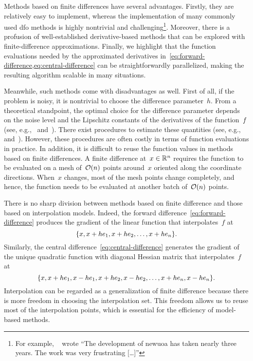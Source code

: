 Methods based on finite differences have several advantages.
Firstly, they are relatively easy to implement, whereas the implementation of many commonly used \gls{dfo} methods is highly nontrivial and challenging\footnote{For example, \citeauthor{Powell_2006}~\cite{Powell_2006} wrote \enquote{The development of \gls{newuoa} has taken nearly three years. The work was very frustrating [\dots]}}.
Moreover, there is a profusion of well-established derivative-based methods that can be explored with finite-difference approximations.
Finally, we highlight that the function evaluations needed by the approximated derivatives in~\cref{eq:forward-difference,eq:central-difference} can be straightforwardly parallelized, making the resulting algorithm scalable in many situations.

Meanwhile, such methods come with disadvantages as well.
First of all, if the problem is noisy, it is nontrivial to choose the difference parameter~$h$.
From a theoretical standpoint, the optimal choice for the difference parameter depends on the noise level and the Lipschitz constants of the derivatives of the function~$f$ (see, e.g.,~\cite[\S~8.1]{Nocedal_Wright_2006} and~\cite[Eqs.~(2.13) and~(2.14)]{Shi_Etal_2021}).
There exist procedures to estimate these quantities (see, e.g.,~\cite[\S~3]{More_Wild_2011} and~\cite[Proc.~I]{Shi_Etal_2021}).
However, these procedures are often costly in terms of function evaluations in practice.
In addition, it is difficult to reuse the function values in methods based on finite differences.
A finite difference at~$x \in \mathbb{R}^n$ requires the function to be evaluated on a mesh of~$\operatorname{\mathcal{O}}(n)$ points around~$x$ oriented along the coordinate directions.
When~$x$ changes, most of the mesh points change completely, and hence, the function needs to be evaluated at another batch of~$\operatorname{\mathcal{O}}(n)$ points.

There is no sharp division between methods based on finite difference and those based on interpolation models.
Indeed, the forward difference~\cref{eq:forward-difference} produces the gradient of the linear function that interpolates~$f$ at
\begin{equation*}
    \{x, x + h e_1, x + h e_2, \dots, x + h e_n\}.
\end{equation*}
Similarly, the central difference~\cref{eq:central-difference} generates the gradient of the unique quadratic function with diagonal Hessian matrix that interpolates~$f$ at
\begin{equation*}
    \{x, x + h e_1, x - h e_1, x + h e_2, x - h e_2, \dots, x + h e_n, x - h e_n\}.
\end{equation*}
Interpolation can be regarded as a generalization of finite difference because there is more freedom in choosing the interpolation set.
This freedom allows us to reuse most of the interpolation points, which is essential for the efficiency of model-based methods.

